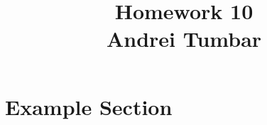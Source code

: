 \documentclass[twoside,11pt]{article}
\newcommand\assignmentNumber{10}
\newcommand\studentName{Andrei Tumbar}
\begin{document}
\title{\vspace{-5cm}Homework \assignmentNumber\\\studentName\vspace{-1cm}}
\maketitle



\section{Example Section}
\label{sec:background}

\end{document}

